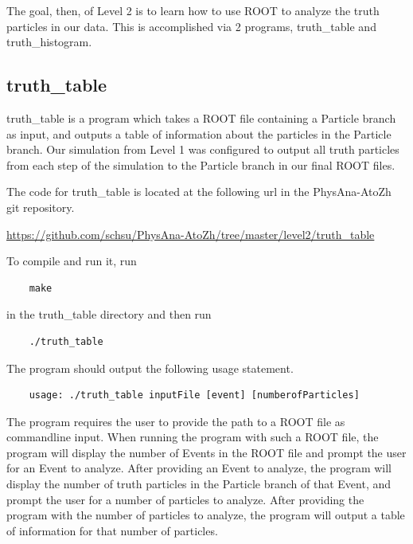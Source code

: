 \documentclass{article}
\begin{document}
\bigskip

The goal, then, of Level 2 is to learn how to use ROOT to analyze the truth particles in our
data. This is accomplished via 2 programs, truth\_table and truth\_histogram.

\subsection{truth\_table}

truth\_table is a program which takes a ROOT file containing a Particle branch
as input, and outputs a table of information about the particles in the Particle
branch. Our simulation from Level 1 was configured to output all truth particles
from each step of the simulation to the Particle branch in our final ROOT files.

\bigskip

The code for truth\_table is located at the following url in the PhysAna-AtoZh git repository.

\bigskip

\url{https://github.com/schsu/PhysAna-AtoZh/tree/master/level2/truth_table}

\bigskip

To compile and run it, run

\begin{verbatim}
	make
\end{verbatim} 

in the truth\_table directory and then run

\begin{verbatim}
	./truth_table
\end{verbatim}

The program should output the following usage statement.

\begin{verbatim}
	usage: ./truth_table inputFile [event] [numberofParticles]
\end{verbatim}

The program requires the user to provide the path to a ROOT file as commandline input.
When running the program with such a ROOT file, the program will display the number of
Events in the ROOT file and prompt the user for an Event to analyze. After providing an
Event to analyze, the program will display the number of truth particles in the Particle
branch of that Event, and prompt the user for a number of particles to analyze. After
providing the program with the number of particles to analyze, the program will output
a table of information for that number of particles.
\end{document}
